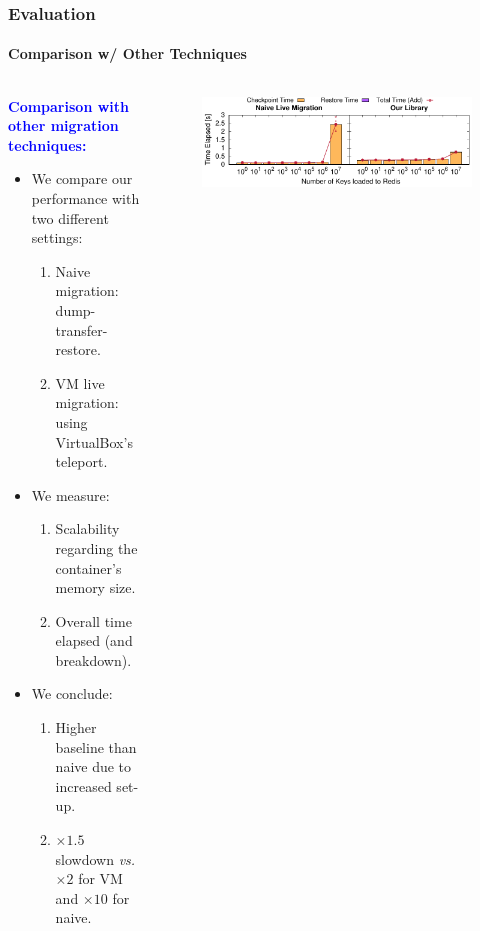 \documentclass[9pt,    %
    english,            %
    xcolor=table,       %
    envcountsect,        %
    aspectratio=169     %
]{beamer}
\begin{document}
\begin{frame}
    \frametitle{Evaluation}
    \framesubtitle{Comparison w/ Other Techniques}

    \begin{columns}
        \begin{column}{.5\textwidth}

            \vspace{-40pt}

            \textbf{\textcolor{blue}{Comparison with other migration techniques:}}
            \begin{itemize}
                \item We compare our performance with two different settings:
                \begin{enumerate}
                    \item Naive migration: dump-transfer-restore.\\[3pt]
                    \item VM live migration: using VirtualBox's teleport.
                \end{enumerate}
                \item We measure:
                \begin{enumerate}
                    \item Scalability regarding the container's memory size.\\[3pt]
                    \item Overall time elapsed (and breakdown).
                \end{enumerate}
                \item We conclude:
                \begin{enumerate}
                    \item Higher baseline than naive due to increased set-up.\\[3pt]
                    \item $\times 1.5$ slowdown \textit{vs.} $\times 2$ for VM and $\times 10$ for naive.
                \end{enumerate}
            \end{itemize}
        \end{column}
        \begin{column}{.5\textwidth}
            \begin{figure}
                \centering
                \includegraphics[width=\textwidth]{./figs/key_scalability.pdf}

\end{figure}
\end{column}
\end{columns}
\end{frame}
\end{document}
